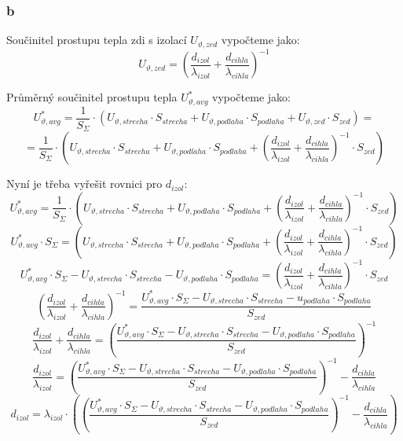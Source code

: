 \documentclass{article}
\begin{document}
\subsubsection{b}
Součinitel prostupu tepla zdi s izolací $U_{\vartheta,zed}$ vypočteme jako:
$$
    U_{\vartheta,zed} = \left( \frac{d_{izol}}{\lambda_{izol}} + \frac{d_{cihla}}{\lambda_{cihla}} \right)^{-1}
$$

Průměrný součinitel prostupu tepla $U_{\vartheta,avg}^{*}$ vypočteme jako:
$$
    U_{\vartheta,avg}^{*} = \frac{1}{S_{\Sigma}} \cdot (U_{\vartheta,strecha} \cdot S_{strecha} + U_{\vartheta,podlaha} \cdot S_{podlaha} + U_{\vartheta,zed} \cdot S_{zed}) =
$$
$$
    = \frac{1}{S_{\Sigma}} \cdot (U_{\vartheta,strecha} \cdot S_{strecha} + U_{\vartheta,podlaha} \cdot S_{podlaha} + \left( \frac{d_{izol}}{\lambda_{izol}} + \frac{d_{cihla}}{\lambda_{cihla}} \right)^{-1} \cdot S_{zed})
$$

Nyní je třeba vyřešit rovnici pro $d_{izol}$:
$$
    U_{\vartheta,avg}^{*} = \frac{1}{S_{\Sigma}} \cdot (U_{\vartheta,strecha} \cdot S_{strecha} + U_{\vartheta,podlaha} \cdot S_{podlaha} + \left( \frac{d_{izol}}{\lambda_{izol}} + \frac{d_{cihla}}{\lambda_{cihla}} \right)^{-1} \cdot S_{zed})
$$
$$
    U_{\vartheta,avg}^{*} \cdot S_{\Sigma} =  (U_{\vartheta,strecha} \cdot S_{strecha} + U_{\vartheta,podlaha} \cdot S_{podlaha} + \left( \frac{d_{izol}}{\lambda_{izol}} + \frac{d_{cihla}}{\lambda_{cihla}} \right)^{-1} \cdot S_{zed})
$$
$$
    U_{\vartheta,avg}^{*} \cdot S_{\Sigma} - U_{\vartheta,strecha} \cdot S_{strecha} - U_{\vartheta,podlaha} \cdot S_{podlaha} = \left( \frac{d_{izol}}{\lambda_{izol}} + \frac{d_{cihla}}{\lambda_{cihla}} \right)^{-1} \cdot S_{zed}
$$
$$
    \left( \frac{d_{izol}}{\lambda_{izol}} + \frac{d_{cihla}}{\lambda_{cihla}} \right)^{-1} = \frac{U_{\vartheta,avg}^{*} \cdot S_{\Sigma} - U_{\vartheta,strecha} \cdot S_{strecha} - u_{podlaha} \cdot S_{podlaha}}{S_{zed}}
$$
$$
    \frac{d_{izol}}{\lambda_{izol}} + \frac{d_{cihla}}{\lambda_{cihla}} = \left( \frac{U_{\vartheta,avg}^{*} \cdot S_{\Sigma} - U_{\vartheta,strecha} \cdot S_{strecha} - U_{\vartheta,podlaha} \cdot S_{podlaha}}{S_{zed}} \right)^{-1}
$$
$$
    \frac{d_{izol}}{\lambda_{izol}} = \left( \frac{U_{\vartheta,avg}^{*} \cdot S_{\Sigma} - U_{\vartheta,strecha} \cdot S_{strecha} - U_{\vartheta,podlaha} \cdot S_{podlaha}}{S_{zed}} \right)^{-1} - \frac{d_{cihla}}{\lambda_{cihla}}
$$
$$
    d_{izol} = \lambda_{izol} \cdot \left( \left( \frac{U_{\vartheta,avg}^{*} \cdot S_{\Sigma} - U_{\vartheta,strecha} \cdot S_{strecha} - U_{\vartheta,podlaha} \cdot S_{podlaha}}{S_{zed}} \right)^{-1} - \frac{d_{cihla}}{\lambda_{cihla}} \right)
$$
\end{document}

